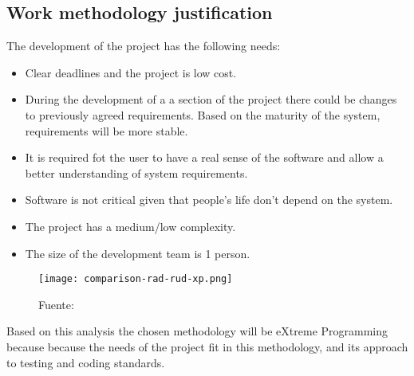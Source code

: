 \subsection{Work methodology justification}
\label{sec:methodology-justification}

The development of the project has the following needs:

\begin{itemize}
    \item Clear deadlines and the project is low cost.
    \item During the development of a a section of the project there could be changes to previously agreed requirements.
        Based on the maturity of the system, requirements will be more stable.
    \item It is required fot the  user to have a real sense of the software and allow a better understanding of system requirements.
    \item Software is not critical given that people's life don't depend on the system.
    \item The project has a medium/low complexity.
    \item The size of the development team is 1 person.
\end{itemize}

\begin{figure}
    \centering
    \texttt{[image: comparison-rad-rud-xp.png]}
    \caption{Fuente: \textcite{geambasu2011influence}}
    \label{fig:comparison-rad-rud-xp}
\end{figure}

Based on this analysis the chosen methodology will be eXtreme Programming because because the needs of the project fit in this methodology, and its approach to testing and coding standards.

